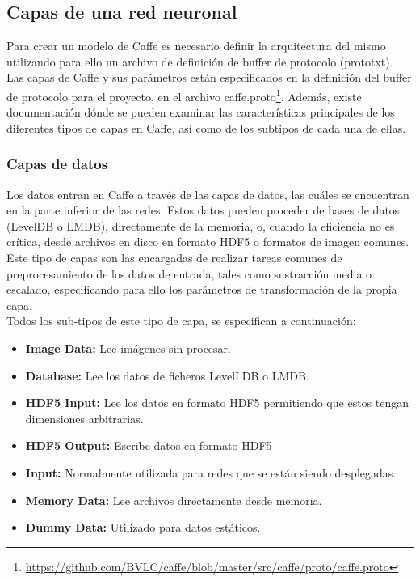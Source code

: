 \documentclass[a4paper, 12pt, spanish, chapterprefix, numbers=noenddot]{book}
\begin{document}
\subsection{Capas de una red neuronal}\label{CapaRedNeuronal}

Para crear un modelo de Caffe es necesario definir la arquitectura del mismo utilizando para ello un archivo de definición de buffer de protocolo (prototxt).\\

Las capas de Caffe y sus parámetros están especificados en la definición del buffer de protocolo para el proyecto, en el archivo caffe.proto\footnote{\url{https://github.com/BVLC/caffe/blob/master/src/caffe/proto/caffe.proto}}. Además, existe documentación\cite{CaffeLayers} dónde se pueden examinar las características principales de los diferentes tipos de capas en Caffe, así como de los subtipos de cada una de ellas.

\subsubsection{Capas de datos}

Los datos entran en Caffe a través de las capas de datos, las cuáles se encuentran en la parte inferior de las redes. Estos datos pueden proceder de bases de datos (LevelDB o LMDB), directamente de la memoria, o, cuando la eficiencia no es crítica, desde archivos en disco en formato HDF5 o formatos de imagen comunes.\\

Este tipo de capas son las encargadas de realizar tareas comunes de preprocesamiento de los datos de entrada, tales como sustracción media o escalado, especificando para ello los parámetros de transformación de la propia capa.\\

Todos los sub-tipos de este tipo de capa, se especifican a continuación:

\begin{itemize}
\item \textbf{Image Data:} Lee imágenes sin procesar.
\item \textbf{Database:} Lee los datos de ficheros LevelLDB o LMDB.
\item \textbf{HDF5 Input:} Lee los datos en formato HDF5 permitiendo que estos tengan dimensiones arbitrarias.
\item \textbf{HDF5 Output:} Escribe datos en formato HDF5
\item \textbf{Input:} Normalmente utilizada para redes que se están siendo desplegadas.
\begin{comment}
\item \textbf{Window Data:}
\end{comment}
\item \textbf{Memory Data:} Lee archivos directamente desde memoria.
\item \textbf{Dummy Data:} Utilizado para datos estáticos.
\end{itemize}
\end{document}
